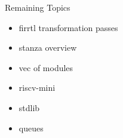 \documentclass[xcolor=pdflatex,dvipsnames,table]{beamer}
\begin{document}
\begin{frame}[fragile]{Remaining Topics}
\begin{itemize}
\item firrtl transformation passes
\item stanza overview  
\item vec of modules
\item riscv-mini
\item stdlib
\item queues
\end{itemize}
\end{frame}
\end{document}

